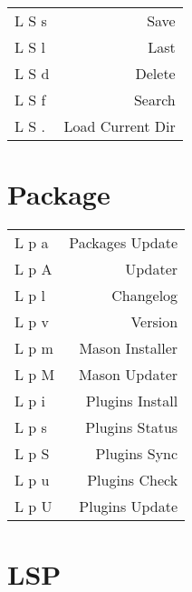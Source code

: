 \documentclass[
  ,landscape
  ,columns=4
]{cheatsheet}
\begin{document}
\begin{tabular}{lr}
	L S s & Save             \\
	L S l & Last             \\
	L S d & Delete           \\
	L S f & Search           \\
	L S . & Load Current Dir \\
\end{tabular}

\section{Package}

\begin{tabular}{lr}
	L p a & Packages Update \\
	L p A & Updater         \\
	L p l & Changelog       \\
	L p v & Version         \\
	L p m & Mason Installer \\
	L p M & Mason Updater   \\
	L p i & Plugins Install \\
	L p s & Plugins Status  \\
	L p S & Plugins Sync    \\
	L p u & Plugins Check   \\
	L p U & Plugins Update  \\
\end{tabular}

\section{LSP}
\end{document}

